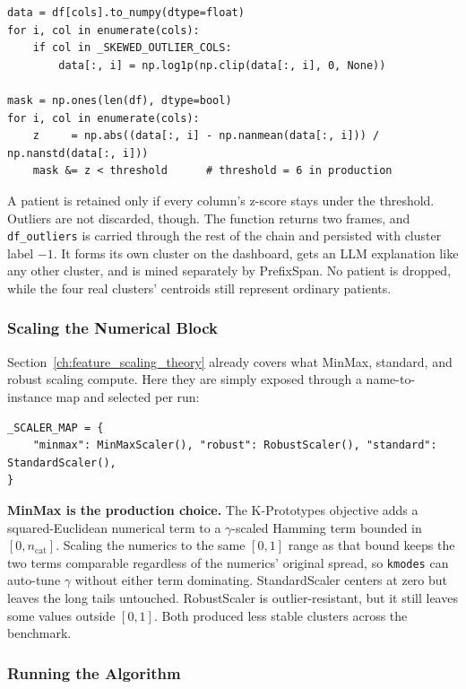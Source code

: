 \begin{lstlisting}[style=pythonstyle]
data = df[cols].to_numpy(dtype=float)
for i, col in enumerate(cols):
    if col in _SKEWED_OUTLIER_COLS:
        data[:, i] = np.log1p(np.clip(data[:, i], 0, None))

mask = np.ones(len(df), dtype=bool)
for i, col in enumerate(cols):
    z     = np.abs((data[:, i] - np.nanmean(data[:, i])) / np.nanstd(data[:, i]))
    mask &= z < threshold      # threshold = 6 in production
\end{lstlisting}

A patient is retained only if every column's z-score stays under the threshold. Outliers are not discarded, though. The function returns two frames, and \texttt{df\_outliers} is carried through the rest of the chain and persisted with cluster label $-1$. It forms its own cluster on the dashboard, gets an LLM explanation like any other cluster, and is mined separately by PrefixSpan. No patient is dropped, while the four real clusters' centroids still represent ordinary patients.

\subsubsection*{Scaling the Numerical Block}

Section~\ref{ch:feature_scaling_theory} already covers what MinMax, standard, and robust scaling compute. Here they are simply exposed through a name-to-instance map and selected per run:

\begin{lstlisting}[style=pythonstyle]
_SCALER_MAP = {
    "minmax": MinMaxScaler(), "robust": RobustScaler(), "standard": StandardScaler(),
}
\end{lstlisting}

\textbf{MinMax is the production choice.} The K-Prototypes objective adds a squared-Euclidean numerical term to a $\gamma$-scaled Hamming term bounded in $[0, n_{\text{cat}}]$. Scaling the numerics to the same $[0,1]$ range as that bound keeps the two terms comparable regardless of the numerics' original spread, so \texttt{kmodes} can auto-tune $\gamma$ without either term dominating. StandardScaler centers at zero but leaves the long tails untouched. RobustScaler is outlier-resistant, but it still leaves some values outside $[0,1]$. Both produced less stable clusters across the benchmark.

\subsubsection*{Running the Algorithm}

